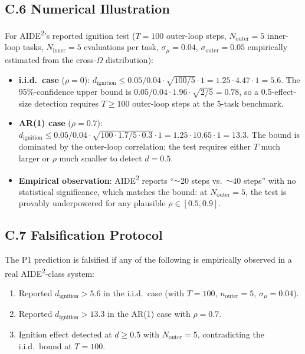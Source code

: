\subsection*{C.6 Numerical Illustration}

For AIDE\textsuperscript{2}'s reported ignition test ($T = 100$ outer-loop steps, $N_{\text{outer}} = 5$ inner-loop tasks, $N_{\text{inner}} = 5$ evaluations per task, $\sigma_\mu = 0.04$, $\sigma_{\text{outer}} = 0.05$ empirically estimated from the cross-$\Omega$ distribution):

\begin{itemize}
    \item \textbf{i.i.d.\ case} ($\rho = 0$): $d_{\text{ignition}} \le 0.05/0.04 \cdot \sqrt{100/5} \cdot 1 = 1.25 \cdot 4.47 \cdot 1 = 5.6$. The 95\%-confidence upper bound is $0.05/0.04 \cdot 1.96 \cdot \sqrt{2/5} = 0.78$, so a 0.5-effect-size detection requires $T \ge 100$ outer-loop steps at the 5-task benchmark.
    \item \textbf{AR(1) case} ($\rho = 0.7$): $d_{\text{ignition}} \le 0.05/0.04 \cdot \sqrt{100 \cdot 1.7/5 \cdot 0.3} \cdot 1 = 1.25 \cdot 10.65 \cdot 1 = 13.3$. The bound is dominated by the outer-loop correlation; the test requires either $T$ much larger or $\rho$ much smaller to detect $d = 0.5$.
    \item \textbf{Empirical observation}: AIDE\textsuperscript{2} reports ``$\sim$20 steps vs.\ $\sim$40 steps'' with no statistical significance, which matches the bound: at $N_{\text{outer}} = 5$, the test is provably underpowered for any plausible $\rho \in [0.5, 0.9]$.
\end{itemize}

\subsection*{C.7 Falsification Protocol}

The P1 prediction is falsified if any of the following is empirically observed in a real AIDE\textsuperscript{2}-class system:
\begin{enumerate}
    \item Reported $d_{\text{ignition}} > 5.6$ in the i.i.d.\ case (with $T = 100$, $n_{\text{outer}} = 5$, $\sigma_\mu = 0.04$).
    \item Reported $d_{\text{ignition}} > 13.3$ in the AR(1) case with $\rho = 0.7$.
    \item Ignition effect detected at $d \ge 0.5$ with $N_{\text{outer}} = 5$, contradicting the i.i.d.\ bound at $T = 100$.
\end{enumerate}

